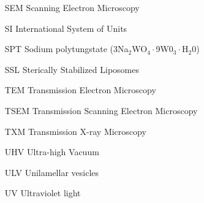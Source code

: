 \begin{itemize}
        \item   [SEM] Scanning Electron Microscopy
        \item   [SI] International System of Units
        \item   [SPT] Sodium polytungstate (3Na$_2$WO$_4\cdot$9W0$_3\cdot$H$_2$0)
        \item   [SSL] Sterically Stabilized Liposomes
        \item   [TEM] Transmission Electron Microscopy
        \item   [TSEM] Transmission Scanning Electron Microscopy
        \item   [TXM] Transmission X-ray Microscopy  
        \item   [UHV] Ultra-high Vacuum      
        \item   [ULV] Unilamellar vesicles
        \item   [UV] Ultraviolet light

        

\end{itemize}

\cleardoublepage

